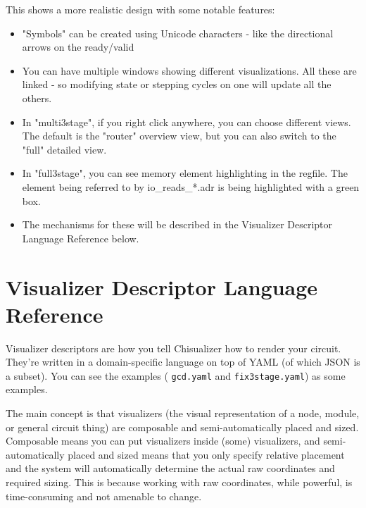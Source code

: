 \documentclass[11pt]{article}
\begin{document}
This shows a more realistic design with some notable features:
\begin{itemize}
  \item "Symbols" can be created using Unicode characters - like the directional arrows on the ready/valid
  \item You can have multiple windows showing different visualizations. All these are linked - so modifying state or stepping cycles on one will update all the others.
  \item In "multi3stage", if you right click anywhere, you can choose different views. The default is the "router" overview view, but you can also switch to the "full" detailed view.
  \item In "full3stage", you can see memory element highlighting in the regfile. The element being referred to by io\_reads\_*.adr is being highlighted with a green box.
  \item The mechanisms for these will be described in the Visualizer Descriptor Language Reference below.
\end{itemize}

\section{Visualizer Descriptor Language Reference}
Visualizer descriptors are how you tell Chisualizer how to render your circuit. They're written in a domain-specific language on top of YAML (of which JSON is a subset). You can see the examples ( \texttt{gcd.yaml} and \texttt{fix3stage.yaml}) as some examples.

The main concept is that visualizers (the visual representation of a node, module, or general circuit thing) are composable and semi-automatically placed and sized. Composable means you can put visualizers inside (some) visualizers, and semi-automatically placed and sized means that you only specify relative placement and the system will automatically determine the actual raw coordinates and required sizing. This is because working with raw coordinates, while powerful, is time-consuming and not amenable to change.
\end{document}
